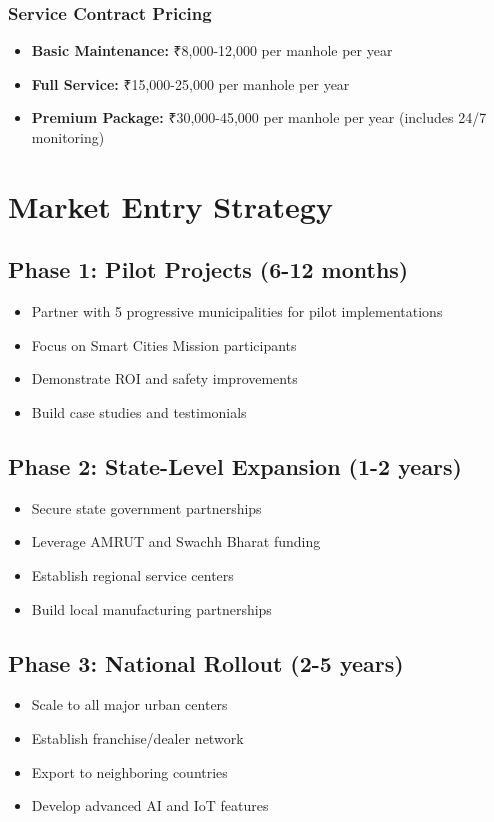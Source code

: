 \documentclass[11pt,a4paper]{article}
\begin{document}
\subsubsection{Service Contract Pricing}
\begin{itemize}[leftmargin=2em]
    \item \textbf{Basic Maintenance:} ₹8,000-12,000 per manhole per year
    \item \textbf{Full Service:} ₹15,000-25,000 per manhole per year
    \item \textbf{Premium Package:} ₹30,000-45,000 per manhole per year (includes 24/7 monitoring)
\end{itemize}

\section{Market Entry Strategy}

\subsection{Phase 1: Pilot Projects (6-12 months)}
\begin{itemize}[leftmargin=2em]
    \item Partner with 5 progressive municipalities for pilot implementations
    \item Focus on Smart Cities Mission participants
    \item Demonstrate ROI and safety improvements
    \item Build case studies and testimonials
\end{itemize}

\subsection{Phase 2: State-Level Expansion (1-2 years)}
\begin{itemize}[leftmargin=2em]
    \item Secure state government partnerships
    \item Leverage AMRUT and Swachh Bharat funding
    \item Establish regional service centers
    \item Build local manufacturing partnerships
\end{itemize}

\subsection{Phase 3: National Rollout (2-5 years)}
\begin{itemize}[leftmargin=2em]
    \item Scale to all major urban centers
    \item Establish franchise/dealer network
    \item Export to neighboring countries
    \item Develop advanced AI and IoT features
\end{itemize}
\end{document}
